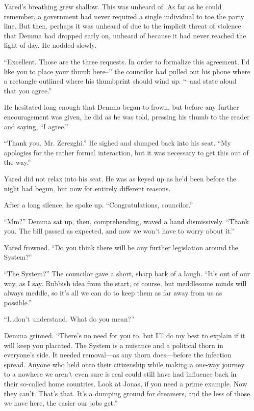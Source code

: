 Yared's breathing grew shallow. This was unheard of. As far as he could remember, a government had never required a single individual to toe the party line. But then, perhaps it was unheard of due to the implicit threat of violence that Demma had dropped early on, unheard of because it had never reached the light of day. He nodded slowly.

``Excellent. Those are the three requests. In order to formalize this agreement, I'd like you to place your thumb here--'' the councilor had pulled out his phone where a rectangle outlined where his thumbprint should wind up. ``--and state aloud that you agree.''

He hesitated long enough that Demma began to frown, but before any further encouragement was given, he did as he was told, pressing his thumb to the reader and saying, ``I agree.''

``Thank you, Mr. Zerezghi.'' He sighed and slumped back into his seat. ``My apologies for the rather formal interaction, but it was necessary to get this out of the way.''

Yared did not relax into his seat. He was as keyed up as he'd been before the night had begun, but now for entirely different reasons.

After a long silence, he spoke up. ``Congratulations, councilor.''

``Mm?'' Demma sat up, then, comprehending, waved a hand dismissively. ``Thank you. The bill passed as expected, and now we won't have to worry about it.''

Yared frowned. ``Do you think there will be any further legislation around the System?''

``The System?'' The councilor gave a short, sharp bark of a laugh. ``It's out of our way, as I say. Rubbish idea from the start, of course, but meddlesome minds will always meddle, so it's all we can do to keep them as far away from us as possible.''

``I\ldots don't understand. What do you mean?''

Demma grinned. ``There's no need for you to, but I'll do my best to explain if it will keep you placated. The System is a nuisance and a political thorn in everyone's side. It needed removal---as any thorn does---before the infection spread. Anyone who held onto their citizenship while making a one-way journey to a nowhere we aren't even sure is real could still have had influence back in their so-called home countries. Look at Jonas, if you need a prime example. Now they can't. That's that. It's a dumping ground for dreamers, and the less of those we have here, the easier our jobs get.''

